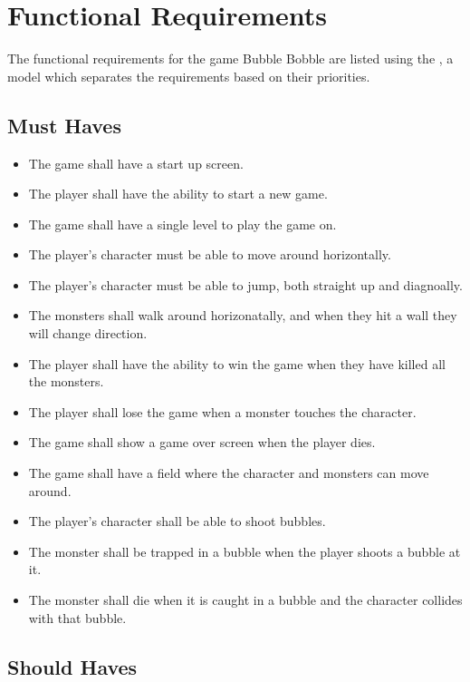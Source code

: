 \chapter{Functional Requirements}

The functional requirements for the game Bubble Bobble are listed using the , a model which separates the requirements based on their priorities.

\section{Must Haves}

\begin{itemize}
\itemsep0em 
 	\item The game shall have a start up screen.
  	\item The player shall have the ability to start a new game.
  	\item The game shall have a single level to play the game on.
  	\item The player's character must be able to move around horizontally.
  	\item The player's character must be able to jump, both straight up and diagnoally.
  	\item The monsters shall walk around horizonatally, and when they hit a wall they will change direction. 
 	\item The player shall have the ability to win the game when they have killed all the monsters.
 	\item The player shall lose the game when a monster touches the character.
 	\item The game shall show a game over screen when the player dies.
 	\item The game shall have a field where the character and monsters can move around.
 	\item The player's character shall be able to shoot bubbles.
 	\item The monster shall be trapped in a bubble when the player shoots a bubble at it.
 	\item The monster shall die when it is caught in a bubble and the character collides with that bubble.
\end{itemize}

\section{Should Haves}

